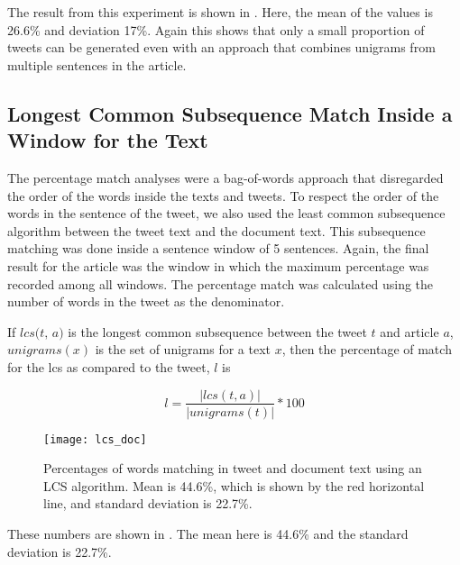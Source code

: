 The result from this experiment is shown in . Here, the mean of the values is 26.6\% and deviation 17\%. Again this shows that only a small proportion of tweets can be generated even with an approach that combines unigrams from multiple sentences in the article.


\subsection{Longest Common Subsequence Match Inside a Window for the Text}
\label{sec:lcs}

The percentage match analyses were a bag-of-words approach that disregarded the order of the words inside the texts and tweets. To respect the order of the words in the sentence of the tweet, we also used the least common subsequence algorithm between the tweet text and the document text. This subsequence matching was done inside a sentence window of 5 sentences. 
Again, the final result for the article was the window in which the maximum percentage was recorded among all windows. The percentage match was calculated using the number of words in the tweet as the denominator.

If $\textit{lcs(t, a)}$ is the longest common subsequence between the tweet $t$ and article $a$, $\textit{unigrams}(x)$ is the set of unigrams for a text $x$, then the percentage of match for the lcs as compared to the tweet, $\textit{l}$ is



\begin{equation}
l = \frac{| lcs(t, a) |}{| unigrams(t) |} * 100
\end{equation}

\begin{figure}[tbp]
\centering
\texttt{[image: lcs\_doc]}
\caption{Percentages of words matching in tweet and document text using an LCS algorithm. Mean is 44.6\%, which is shown by the red horizontal line, and standard deviation is 22.7\%.}
\label{fig:lcs}
\end{figure}

 These numbers are shown in . The mean here is 44.6\% and the standard deviation is 22.7\%. 

